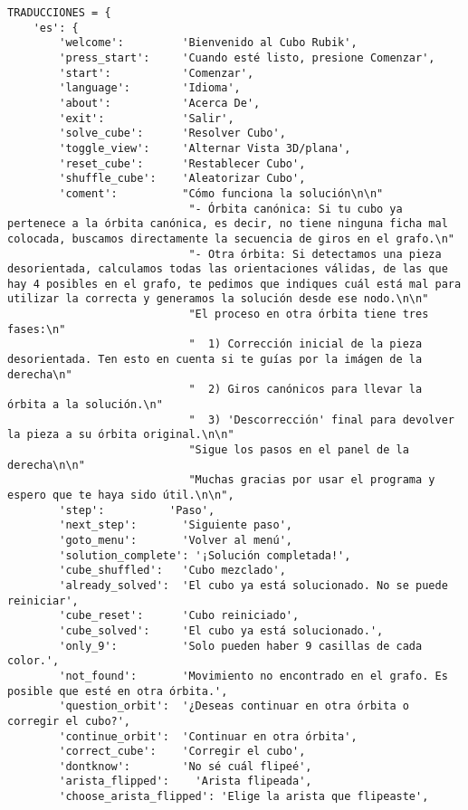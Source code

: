 \begin{lstlisting}
TRADUCCIONES = {
    'es': {
        'welcome':         'Bienvenido al Cubo Rubik',
        'press_start':     'Cuando esté listo, presione Comenzar',
        'start':           'Comenzar',
        'language':        'Idioma',
        'about':           'Acerca De',
        'exit':            'Salir',
        'solve_cube':      'Resolver Cubo',
        'toggle_view':     'Alternar Vista 3D/plana',
        'reset_cube':      'Restablecer Cubo',
        'shuffle_cube':    'Aleatorizar Cubo',
        'coment':          "Cómo funciona la solución\n\n"
                            "- Órbita canónica: Si tu cubo ya pertenece a la órbita canónica, es decir, no tiene ninguna ficha mal colocada, buscamos directamente la secuencia de giros en el grafo.\n"
                            "- Otra órbita: Si detectamos una pieza desorientada, calculamos todas las orientaciones válidas, de las que hay 4 posibles en el grafo, te pedimos que indiques cuál está mal para utilizar la correcta y generamos la solución desde ese nodo.\n\n"
                            "El proceso en otra órbita tiene tres fases:\n"
                            "  1) Corrección inicial de la pieza desorientada. Ten esto en cuenta si te guías por la imágen de la derecha\n"
                            "  2) Giros canónicos para llevar la órbita a la solución.\n"
                            "  3) 'Descorrección' final para devolver la pieza a su órbita original.\n\n"
                            "Sigue los pasos en el panel de la derecha\n\n"
                            "Muchas gracias por usar el programa y espero que te haya sido útil.\n\n",
        'step':          'Paso',
        'next_step':       'Siguiente paso',
        'goto_menu':       'Volver al menú',
        'solution_complete': '¡Solución completada!',
        'cube_shuffled':   'Cubo mezclado',
        'already_solved':  'El cubo ya está solucionado. No se puede reiniciar',
        'cube_reset':      'Cubo reiniciado',
        'cube_solved':     'El cubo ya está solucionado.',
        'only_9':          'Solo pueden haber 9 casillas de cada color.',
        'not_found':       'Movimiento no encontrado en el grafo. Es posible que esté en otra órbita.',
        'question_orbit':  '¿Deseas continuar en otra órbita o corregir el cubo?',
        'continue_orbit':  'Continuar en otra órbita',
        'correct_cube':    'Corregir el cubo',
        'dontknow':        'No sé cuál flipeé',
        'arista_flipped':    'Arista flipeada',
        'choose_arista_flipped': 'Elige la arista que flipeaste',

\end{lstlisting}
